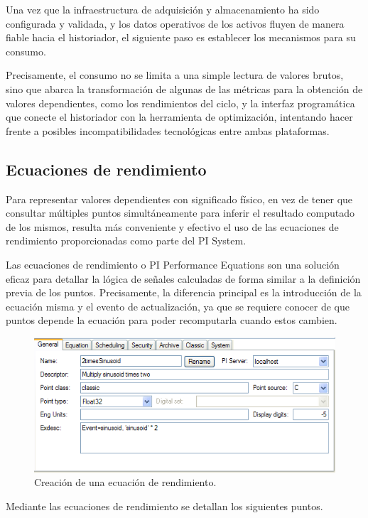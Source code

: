 Una vez que la infraestructura de adquisición y almacenamiento ha sido configurada y validada, y los datos operativos de los activos fluyen de manera fiable hacia el historiador, el siguiente paso es establecer los mecanismos para su consumo.

Precisamente, el consumo no se limita a una simple lectura de valores brutos, sino que abarca la transformación de algunas de las métricas para la obtención de valores dependientes, como los rendimientos del ciclo, y la interfaz programática que conecte el historiador con la herramienta de optimización, intentando hacer frente a posibles incompatibilidades tecnológicas entre ambas plataformas.

\subsection{Ecuaciones de rendimiento}
\label{makereference3.5.1}

Para representar valores dependientes con significado físico, en vez de tener que consultar múltiples puntos simultáneamente para inferir el resultado computado de los mismos, resulta más conveniente y efectivo el uso de las ecuaciones de rendimiento proporcionadas como parte del PI System.

Las ecuaciones de rendimiento o PI Performance Equations son una solución eficaz para detallar la lógica de señales calculadas de forma similar a la definición previa de los puntos. Precisamente, la diferencia principal es la introducción de la ecuación misma y el evento de actualización, ya que se requiere conocer de que puntos depende la ecuación para poder recomputarla cuando estos cambien.

\begin{figure}
  \centering
  \includegraphics[width=0.5\linewidth]{figures/ecuaciones-de-rendimiento.png}
  \caption{Creación de una ecuación de rendimiento.}
  \label{fig:ecuaciones-de-rendimiento}
\end{figure}

Mediante las ecuaciones de rendimiento se detallan los siguientes puntos.

